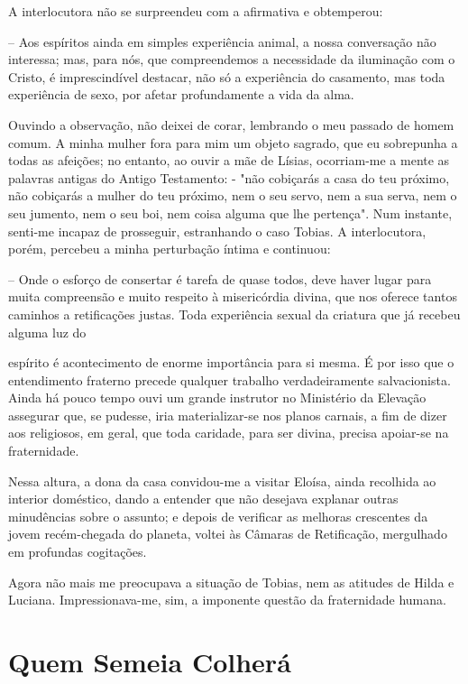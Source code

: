 \documentclass[portuguese,12pt,a4paper]{scrbook}
\begin{document}
	A interlocutora não se surpreendeu com a afirmativa e obtemperou:
	
	– Aos espíritos ainda em simples experiência animal, a nossa conversação não interessa; mas, para nós, que compreendemos a necessidade da iluminação com o Cristo, é imprescindível destacar, não só a experiência do casamento, mas toda experiência de sexo, por afetar profundamente a vida da alma.
	
	Ouvindo a observação, não deixei de corar, lembrando o meu passado de homem comum. A minha mulher fora para mim um objeto sagrado, que eu sobrepunha a todas as afeições; no entanto, ao ouvir a mãe de Lísias, ocorriam-me a mente as palavras antigas do Antigo Testamento: - "não cobiçarás a casa do teu próximo, não cobiçarás a mulher do teu próximo, nem o seu servo, nem a sua serva, nem o seu jumento, nem o seu boi, nem coisa alguma que lhe pertença". Num instante, senti-me incapaz de prosseguir, estranhando o caso Tobias. A interlocutora, porém, percebeu a minha perturbação íntima e continuou:
	
	– Onde o esforço de consertar é tarefa de quase todos, deve haver lugar para muita compreensão e muito respeito à misericórdia divina, que nos oferece tantos caminhos a retificações justas. Toda experiência sexual da criatura que já recebeu alguma luz do
	
	
	espírito é acontecimento de enorme importância para si mesma. É por isso que o entendimento fraterno precede qualquer trabalho verdadeiramente salvacionista. Ainda há pouco tempo ouvi um grande instrutor no Ministério da Elevação assegurar que, se pudesse, iria materializar-se nos planos carnais, a fim de dizer aos religiosos, em geral, que toda caridade, para ser divina, precisa apoiar-se na fraternidade.
	
	Nessa altura, a dona da casa convidou-me a visitar Eloísa, ainda recolhida ao interior doméstico, dando a entender que não desejava explanar outras minudências sobre o assunto; e depois de verificar as melhoras crescentes da jovem recém-chegada do planeta, voltei às Câmaras de Retificação, mergulhado em profundas cogitações.
	
	Agora não mais me preocupava a situação de Tobias, nem as atitudes de Hilda e Luciana. Impressionava-me, sim, a imponente questão da fraternidade humana.
	
	
	\chapter{Quem Semeia Colherá}
	
\end{document}
